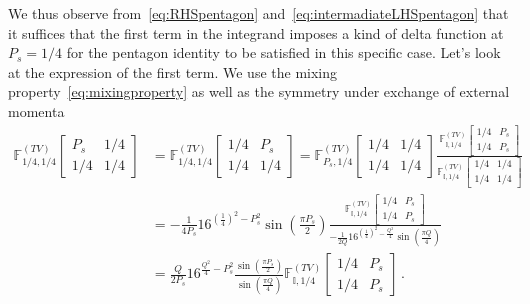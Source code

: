 \documentclass[11pt]{article}
\begin{document}
We thus observe from~\eqref{eq:RHSpentagon} and~\eqref{eq:intermadiateLHSpentagon} that it suffices that the first term in the integrand imposes a kind of delta function at $P_s=1/4$ for the pentagon identity to be satisfied in this specific case. Let's look at the expression of the first term. We use the mixing property~\eqref{eq:mixingproperty} as well as the symmetry under exchange of external momenta
\begin{equation}
    \begin{aligned}
    \mathbb{F}^{(TV)}_{1/4, 1/4} 
    \begin{bmatrix}
     P_s & 1/4 \\
     1/4 & 1/4
     \end{bmatrix} &= \mathbb{F}^{(TV)}_{1/4, 1/4} 
    \begin{bmatrix}
     1/4 & P_s \\
     1/4 & 1/4
     \end{bmatrix} = \mathbb{F}^{(TV)}_{P_s, 1/4} 
    \begin{bmatrix}
     1/4 & 1/4 \\
     1/4 & 1/4
    \end{bmatrix}\frac{\mathbb{F}^{(TV)}_{\mathbb{I}, 1/4} 
    \begin{bmatrix}
     1/4 & P_s \\
     1/4 & P_s \end{bmatrix}}{\mathbb{F}^{(TV)}_{\mathbb{I}, 1/4} 
    \begin{bmatrix}
     1/4 & 1/4 \\
     1/4 & 1/4 \end{bmatrix}}\\
    &= -\frac{1}{4P_s}16^{\left(\frac{1}{4}\right)^2-P_s^2}\sin\left(\frac{\pi P_s}{2}\right)\frac{\mathbb{F}^{(TV)}_{\mathbb{I}, 1/4} 
    \begin{bmatrix}
     1/4 & P_s \\
     1/4 & P_s \end{bmatrix}}{-\frac{1}{2Q}16^{\left(\frac{1}{4}\right)^2-\frac{Q^2}{4}}\sin\left(\frac{\pi Q}{4}\right)}\\
    &= \frac{Q}{2P_s}16^{\frac{Q^2}{4}-P_s^2}\frac{\sin\left(\frac{\pi P_s}{2}\right)}{\sin\left(\frac{\pi Q}{4}\right)}\mathbb{F}^{(TV)}_{\mathbb{I}, 1/4} 
    \begin{bmatrix}
     1/4 & P_s \\
     1/4 & P_s \end{bmatrix}\,.
    \end{aligned}
\end{equation}
\end{document}
